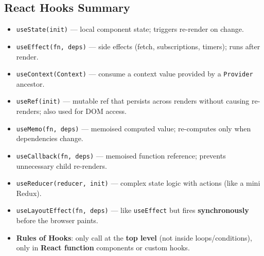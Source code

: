 \documentclass[hidelinks]{article}
\begin{document}
\subsection{React Hooks Summary}
\begin{itemize}
  \item \texttt{useState(init)} --- local component state; triggers re-render on change.
  \item \texttt{useEffect(fn, deps)} --- side effects (fetch, subscriptions, timers); runs after render.
  \item \texttt{useContext(Context)} --- consume a context value provided by a \texttt{Provider} ancestor.
  \item \texttt{useRef(init)} --- mutable ref that persists across renders without causing re-renders; also used for DOM access.
  \item \texttt{useMemo(fn, deps)} --- memoised computed value; re-computes only when dependencies change.
  \item \texttt{useCallback(fn, deps)} --- memoised function reference; prevents unnecessary child re-renders.
  \item \texttt{useReducer(reducer, init)} --- complex state logic with actions (like a mini Redux).
  \item \texttt{useLayoutEffect(fn, deps)} --- like \texttt{useEffect} but fires \textbf{synchronously} before the browser paints.
  \item \textbf{Rules of Hooks}: only call at the \textbf{top level} (not inside loops/conditions), only in \textbf{React function} components or custom hooks.
\end{itemize}
\end{document}
